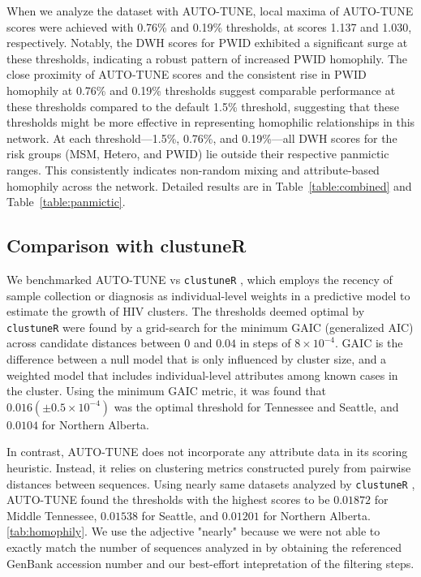 \documentclass[utf8]{FrontiersinHarvard} %
\begin{document}
When we analyze the dataset with AUTO-TUNE, local maxima of AUTO-TUNE scores
were achieved with 0.76\% and 0.19\% thresholds, at scores 1.137 and 1.030,
respectively. Notably, the DWH scores for PWID exhibited a significant surge at
these thresholds, indicating a robust pattern of increased PWID homophily. The
close proximity of AUTO-TUNE scores and the consistent rise in PWID homophily
at 0.76\% and 0.19\% thresholds suggest comparable performance at these
thresholds compared to the default 1.5\% threshold, suggesting that these
thresholds might be more effective in representing homophilic relationships in
this network. At each threshold—1.5\%, 0.76\%, and 0.19\%—all DWH scores for
the risk groups (MSM, Hetero, and PWID) lie outside their respective panmictic
ranges. This consistently indicates non-random mixing and attribute-based
homophily across the network. Detailed results are in
Table~\ref{table:combined} and Table~\ref{table:panmictic}.

\subsection{Comparison with clustuneR}

We benchmarked AUTO-TUNE vs {\tt clustuneR} \cite{chato_public_2020}, which
employs the recency of sample collection or diagnosis as individual-level
weights in a predictive model to estimate the growth of HIV clusters. The
thresholds deemed optimal by {\tt clustuneR} were found by a grid-search for
the minimum GAIC (generalized AIC) across candidate distances between $0$ and
$0.04$ in steps of $8 \times 10^{-4}$. GAIC is the difference between a null
model that is only influenced by cluster size, and a weighted model that
includes individual-level attributes among known cases in the cluster. Using
the minimum GAIC metric, it was found that $0.016 (\pm 0.5\times 10^{-4})$ was
the optimal threshold for Tennessee and Seattle, and $0.0104$ for Northern
Alberta.

In contrast, AUTO-TUNE does not incorporate any attribute data in its scoring
heuristic. Instead, it relies on clustering metrics constructed purely from
pairwise distances between sequences. Using nearly same datasets analyzed by
	{\tt clustuneR} \citep{chato_public_2020}, AUTO-TUNE found the thresholds with
the highest scores to be $0.01872$ for Middle Tennessee, $0.01538$ for Seattle,
and $0.01201$ for Northern Alberta. \autoref{tab:homophily}. We use the
adjective "nearly" because we were not able to exactly match the number of
sequences analyzed in \citet{chato_public_2020} by obtaining the referenced
GenBank accession number and our best-effort intepretation of the filtering
steps.
\end{document}

